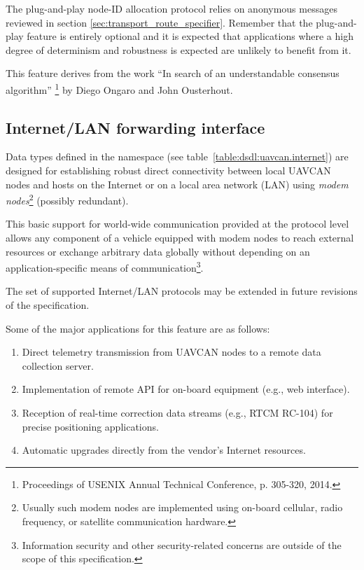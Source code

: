 The plug-and-play node-ID allocation protocol relies on anonymous messages reviewed in section
\ref{sec:transport_route_specifier}.
Remember that the plug-and-play feature is entirely optional and it is expected that applications where a
high degree of determinism and robustness is expected are unlikely to benefit from it.

This feature derives from the work
``In search of an understandable consensus algorithm''%
\footnote{Proceedings of USENIX Annual Technical Conference, p. 305-320, 2014.}
by Diego Ongaro and John Ousterhout.


\subsection{Internet/LAN forwarding interface}

Data types defined in the namespace  (see table~\ref{table:dsdl:uavcan.internet})
are designed for establishing robust direct connectivity between local UAVCAN nodes and hosts on the Internet
or on a local area network (LAN) using \emph{modem nodes}\footnote{%
      Usually such modem nodes are implemented using on-board cellular, radio frequency,
      or satellite communication hardware.
} (possibly redundant).

This basic support for world-wide communication provided at the protocol level allows any component
of a vehicle equipped with modem nodes to reach external resources or exchange arbitrary data globally
without depending on an application-specific means of communication\footnote{%
    Information security and other security-related concerns are outside of the scope of this specification.
}.

The set of supported Internet/LAN protocols may be extended in future revisions of the specification.

\begin{remark}
    Some of the major applications for this feature are as follows:
    \begin{enumerate}
        \item Direct telemetry transmission from UAVCAN nodes to a remote data collection server.
        \item Implementation of remote API for on-board equipment (e.g., web interface).
        \item Reception of real-time correction data streams (e.g., RTCM RC-104)
              for precise positioning applications.
        \item Automatic upgrades directly from the vendor's Internet resources.
    \end{enumerate}
\end{remark}

